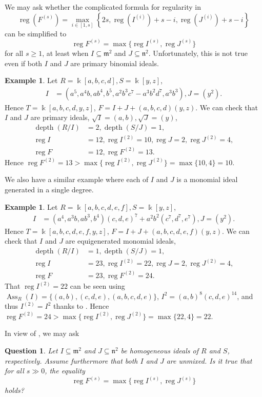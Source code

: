 \documentclass{amsart}
\DeclareMathOperator{\Ass}{Ass}
\DeclareMathOperator{\depth}{depth}
\DeclareMathOperator{\reg}{reg}
\newcommand{\mm}{\mathfrak{m}}
\newcommand{\nn}{\mathfrak{n}}
\theoremstyle{plain}
\newtheorem{quest}[thm]{Question}
\theoremstyle{definition}
\newtheorem{ex}[thm]{Example}
\numberwithin{equation}{section}
\newcommand{\kk}{\Bbbk}
\begin{document}
We may ask whether the complicated formula for regularity in 
$$
\reg(F^{(s)})=\max\limits_{i\in [1,s]} \left\{2s,\reg(I^{(i)})+s-i, \reg(J^{(i)})+s-i\right \}
$$
can be simplified to 
$$
\reg F^{(s)}=\max\{\reg I^{(s)}, \reg J^{(s)}\}
$$ 
for all $s\ge 1$, at least when $I\subseteq \mm^2$ and $J\subseteq \nn^2$. Unfortunately, this is not true even if both $I$ and $J$ are primary binomial ideals.
\begin{ex}
Let $R=\kk[a,b,c,d], S=\kk[y,z]$, 
\begin{align*}
I &= (a^5,a^4b,ab^4,b^5, a^2b^3c^7-a^3b^2d^7,a^3b^3),J= (y^2).
\end{align*}
Hence $T=\kk[a,b,c,d,y,z]$, $F=I+J+(a,b,c,d)(y,z)$. We can check that $I$ and $J$ are primary ideals, $\sqrt{I}=(a,b), \sqrt{J}=(y)$, 
\begin{align*}
\depth(R/I)&=2, \depth(S/J)=1,\\
\reg I &= 12, \reg I^{(2)}=10, \reg J=2, \reg J^{(2)}=4,\\
\reg F &= 12, \reg F^{(2)}=13.
\end{align*}
Hence $\reg F^{(2)}=13 > \max\{\reg I^{(2)},\reg J^{(2)}\}=\max\{10,4\} =10.$ 
\end{ex}
We also have a similar example where each of $I$ and $J$ is a monomial ideal generated in a single degree.
\begin{ex}
Let $R=\kk[a,b,c,d,e,f], S=\kk[y,z]$, 
\begin{align*}
I &= (a^4,a^3b,ab^3,b^4)(c,d,e)^7+a^2b^2(c^7,d^7,e^7),J= (y^2).
\end{align*}
Hence $T=\kk[a,b,c,d,e,f,y,z]$, $F=I+J+(a,b,c,d,e,f)(y,z)$. We can check that $I$ and $J$ are equigenerated monomial ideals, 
\begin{align*}
\depth(R/I)&=1, \depth(S/J)=1,\\
\reg I &= 23, \reg I^{(2)}=22, \reg J=2, \reg J^{(2)}=4,\\
\reg F &= 23, \reg F^{(2)}=24.
\end{align*}
That $\reg I^{(2)}=22$ can be seen using $\Ass_R(I)=\{(a,b), (c,d,e), (a,b,c,d,e)\}$, $I^2=(a,b)^8(c,d,e)^{14}$, and thus $I^{(2)}=I^2$ thanks to \cite[Lemma 2.2]{HJKN}. Hence $\reg F^{(2)}=24 > \max\{\reg I^{(2)},\reg J^{(2)}\}=\max\{22,4\} =22.$ 
\end{ex}
In view of , we may ask
\begin{quest}
\label{quest_reg_larsymbpow}
Let $I\subseteq \mm^2$ and $J\subseteq \nn^2$ be homogeneous ideals of $R$ and $S$, respectively. Assume furthermore that both $I$ and $J$ are unmixed. Is it true that for all $s\gg 0$, the equality
\[
\reg F^{(s)}=\max\{\reg I^{(s)}, \reg J^{(s)}\}
\]
holds?
\end{quest}
\end{document}

